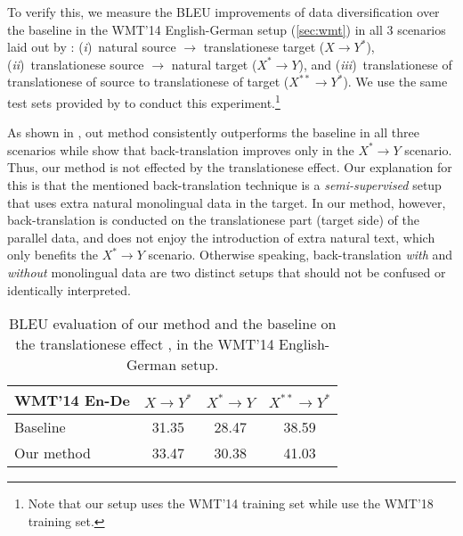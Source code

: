 \documentclass{article}
\newcommand{\Ni}{({\em i})~}
\newcommand{\Nii}{({\em ii})~}
\newcommand{\Niii}{({\em iii})~}
\begin{document}
{
To verify this, we measure the BLEU improvements of data diversification over the baseline \citep{scaling_nmt_ott2018scaling} in the WMT'14 English-German setup (\cref{sec:wmt}) in all 3 scenarios laid out by \citet{eval_back_translation_translationese}: \Ni natural source $\rightarrow$ translationese target ($X\rightarrow Y^*$), \Nii translationese source $\rightarrow$ natural target ($X^*\rightarrow Y$), and \Niii translationese of translationese of source to translationese of target ($X^{**}\rightarrow Y^*$). We use the same test sets provided by \citet{eval_back_translation_translationese} to conduct this experiment.\footnote{Note that our setup uses the WMT'14 training set while \citet{eval_back_translation_translationese} use the WMT'18 training set.}
}

{
As shown in , out method consistently outperforms the baseline in all three scenarios while \citet{eval_back_translation_translationese} show that back-translation \citep{backtranslate_sennrich-etal-2016-improving} improves only in the $X^*\rightarrow Y$ scenario. Thus, our method is not effected by the translationese effect. Our explanation for this is that the mentioned back-translation technique \citep{backtranslate_sennrich-etal-2016-improving} is a \emph{semi-supervised} setup that uses extra natural monolingual data in the target. In our method, however, back-translation is conducted on the translationese part (target side) of the parallel data, and does not enjoy the introduction of extra natural text, which only benefits the $X^*\rightarrow Y$ scenario. Otherwise speaking, back-translation \emph{with} and \emph{without} monolingual data are two distinct setups that should not be confused or identically interpreted.
}


\begin{table}[hbt!]
\vspace{-0.5em}
\begin{center}
\caption{BLEU evaluation of our method and the baseline on the translationese effect \citep{eval_back_translation_translationese}, in the WMT'14 English-German setup.}
\begin{tabular}{lccc}
\toprule
{\bf WMT'14 En-De} & {\bf $X\rightarrow Y^*$}     & {\bf $X^*\rightarrow Y$}      & {\bf $X^{**}\rightarrow Y^*$} \\
\midrule
Baseline \citep{scaling_nmt_ott2018scaling}        & 31.35   & 28.47   & 38.59   \\
Our method      & 33.47   & 30.38   & 41.03\\
\bottomrule
\end{tabular}
\vspace{-1em}
\label{table:translationese}
\end{center}
\end{table}
\end{document}
